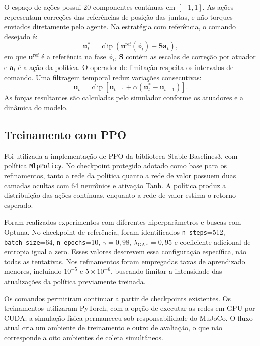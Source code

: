 O espaço de ações possui 20 componentes contínuas em $[-1,1]$. As ações representam correções das referências de posição das juntas, e não torques enviados diretamente pelo agente. Na estratégia com referência, o comando desejado é:
\begin{equation}
\mathbf{u}^{*}_{t}=\operatorname{clip}\!\left(
\mathbf{u}^{\mathrm{ref}}(\phi_t)+\mathbf{S}\mathbf{a}_t\right),
\end{equation}
em que $\mathbf{u}^{\mathrm{ref}}$ é a referência na fase $\phi_t$, $\mathbf{S}$ contém as escalas de correção por atuador e $\mathbf{a}_t$ é a ação da política. O operador de limitação respeita os intervalos de comando. Uma filtragem temporal reduz variações consecutivas:
\begin{equation}
\mathbf{u}_t=\operatorname{clip}\!\left[
\mathbf{u}_{t-1}+\alpha(\mathbf{u}^{*}_t-\mathbf{u}_{t-1})\right].
\end{equation}
As forças resultantes são calculadas pelo simulador conforme os atuadores e a dinâmica do modelo.

\subsection{Treinamento com PPO}

Foi utilizada a implementação de PPO da biblioteca Stable-Baselines3, com política \texttt{MlpPolicy}. No checkpoint protegido adotado como base para os refinamentos, tanto a rede da política quanto a rede de valor possuem duas camadas ocultas com 64 neurônios e ativação Tanh. A política produz a distribuição das ações contínuas, enquanto a rede de valor estima o retorno esperado.

Foram realizados experimentos com diferentes hiperparâmetros e buscas com Optuna. No checkpoint de referência, foram identificados \texttt{n\_steps}=512, \texttt{batch\_size}=64, \texttt{n\_epochs}=10, $\gamma=0{,}98$, $\lambda_{\mathrm{GAE}}=0{,}95$ e coeficiente adicional de entropia igual a zero. Esses valores descrevem essa configuração específica, não todas as tentativas. Nos refinamentos foram empregadas taxas de aprendizado menores, incluindo $10^{-5}$ e $5\times10^{-6}$, buscando limitar a intensidade das atualizações da política previamente treinada.

Os comandos permitiram continuar a partir de checkpoints existentes. Os treinamentos utilizaram PyTorch, com a opção de executar as redes em GPU por CUDA; a simulação física permaneceu sob responsabilidade do MuJoCo. O fluxo atual cria um ambiente de treinamento e outro de avaliação, o que não corresponde a oito ambientes de coleta simultâneos.

